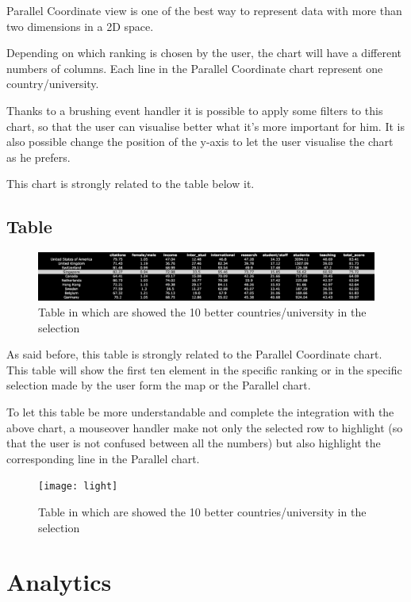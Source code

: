 \documentclass[journal]{vgtc}                %
\begin{document}
Parallel Coordinate view is one of the best way to represent data with more than two dimensions in a 2D space. 

Depending on which ranking is chosen by the user, the chart will have a different numbers of columns. Each line in the Parallel Coordinate chart represent one country/university.

Thanks to a brushing event handler it is possible to apply some filters to this chart, so that the user can visualise better what it's more important for him.
It is also possible change the position of the y-axis to let the user visualise the chart as he prefers.

This chart is strongly related to the table below it.

\subsection{Table}

\begin{figure}[h]
  \centering
  \includegraphics[scale=0.18]{table}
  \caption{Table in which are showed the 10 better countries/university in the selection}
  \label{Table}
\end{figure}

As said before, this table is strongly related to the Parallel Coordinate chart. This table will show the first ten element in the specific ranking or in the specific selection made by the user form the map or the Parallel chart. 

To let this table be more understandable and complete the integration with the above chart, a mouseover handler make not only the selected row to highlight (so that the user is not confused between all the numbers) but also highlight the corresponding line in the Parallel chart.

\begin{figure}[h]
  \centering
  \texttt{[image: light]}
  \caption{Table in which are showed the 10 better countries/university in the selection}
  \label{Table}
\end{figure}
\section{Analytics}
\end{document}
